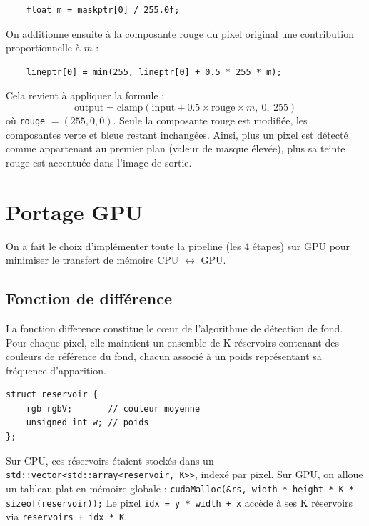 \documentclass[12pt]{article}
\begin{document}
    \begin{verbatim}
    float m = maskptr[0] / 255.0f;
    \end{verbatim}
    On additionne ensuite à la composante rouge du pixel original une contribution proportionnelle à $m$ :

    \begin{verbatim}
    lineptr[0] = min(255, lineptr[0] + 0.5 * 255 * m);
    \end{verbatim}

    Cela revient à appliquer la formule :
    \[
        \text{output} = \text{clamp}\left(\text{input} + 0.5 \times \text{rouge} \times m,\ 0,\ 255\right)
    \]
    où \verb|rouge| $= (255, 0, 0)$. Seule la composante rouge est modifiée, les composantes verte et bleue restant inchangées. Ainsi, plus un pixel est détecté comme appartenant au premier plan (valeur de masque élevée), plus sa teinte rouge est accentuée dans l'image de sortie.

    \section{Portage GPU}
    On a fait le choix d'implémenter toute la pipeline (les 4 étapes) sur GPU pour minimiser le transfert de mémoire CPU $\leftrightarrow$ GPU.

    \subsection{Fonction de différence}
    La fonction difference constitue le cœur de l'algorithme de détection de fond. Pour chaque pixel, elle maintient un ensemble de K réservoirs contenant des couleurs de référence du fond, chacun associé à un poids représentant sa fréquence d'apparition.

    \begin{verbatim}
struct reservoir {
    rgb rgbV;       // couleur moyenne
    unsigned int w; // poids
};
    \end{verbatim}
    Sur CPU, ces réservoirs étaient stockés dans un \verb|std::vector<std::array<reservoir, K>>|, indexé par pixel. Sur GPU, on alloue un tableau plat en mémoire globale :
    \verb|cudaMalloc(&rs, width * height * K * sizeof(reservoir));|
    Le pixel \verb|idx = y * width + x| accède à ses K réservoirs via \verb|reservoirs + idx * K|.
\end{document}
